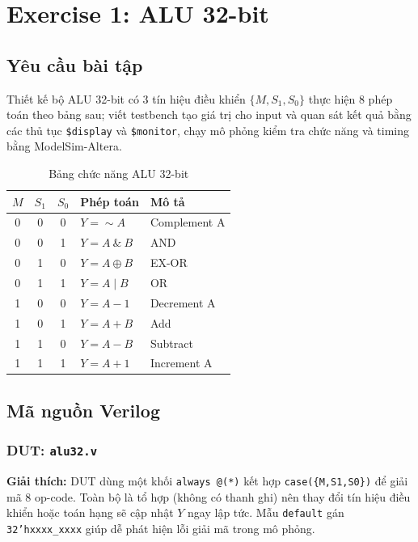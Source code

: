 \documentclass[12pt,a4paper]{article}
\begin{document}
\section{Exercise 1: ALU 32-bit}

\subsection{Yêu cầu bài tập}
Thiết kế bộ ALU 32-bit có 3 tín hiệu điều khiển $\{M, S_1, S_0\}$ thực hiện 8 phép toán theo bảng sau; viết testbench tạo giá trị cho input và quan sát kết quả bằng các thủ tục \texttt{\$display} và \texttt{\$monitor}, chạy mô phỏng kiểm tra chức năng và timing bằng ModelSim-Altera.

\begin{table}[H]
\centering
\begin{tabular}{ccc|l|l}
\toprule
$M$ & $S_1$ & $S_0$ & \textbf{Phép toán} & \textbf{Mô tả} \\
\midrule
0 & 0 & 0 & $Y = \sim A$       & Complement A \\
0 & 0 & 1 & $Y = A \ \&\  B$   & AND \\
0 & 1 & 0 & $Y = A \oplus B$   & EX-OR \\
0 & 1 & 1 & $Y = A \mid B$     & OR \\
1 & 0 & 0 & $Y = A - 1$        & Decrement A \\
1 & 0 & 1 & $Y = A + B$        & Add \\
1 & 1 & 0 & $Y = A - B$        & Subtract \\
1 & 1 & 1 & $Y = A + 1$        & Increment A \\
\bottomrule
\end{tabular}
\caption{Bảng chức năng ALU 32-bit}
\end{table}

\subsection{Mã nguồn Verilog}

\subsubsection{DUT: \texttt{alu32.v}}


\textbf{Giải thích:} DUT dùng một khối \texttt{always @(*)} kết hợp \texttt{case(\{M,S1,S0\})} để giải mã 8 op-code. Toàn bộ là tổ hợp (không có thanh ghi) nên thay đổi tín hiệu điều khiển hoặc toán hạng sẽ cập nhật $Y$ ngay lập tức. Mẫu \texttt{default} gán \texttt{32'hxxxx\_xxxx} giúp dễ phát hiện lỗi giải mã trong mô phỏng.
\end{document}
